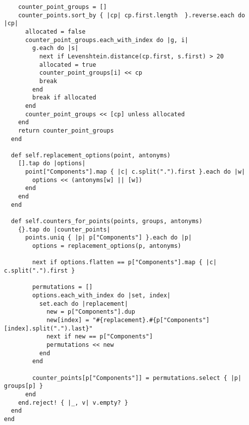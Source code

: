 \documentclass{article}
\begin{document}
\begin{verbatim}
    counter_point_groups = []
    counter_points.sort_by { |cp| cp.first.length  }.reverse.each do |cp|
      allocated = false
      counter_point_groups.each_with_index do |g, i|
        g.each do |s|
          next if Levenshtein.distance(cp.first, s.first) > 20
          allocated = true
          counter_point_groups[i] << cp
          break
        end
        break if allocated
      end
      counter_point_groups << [cp] unless allocated
    end
    return counter_point_groups
  end

  def self.replacement_options(point, antonyms)
    [].tap do |options|
      point["Components"].map { |c| c.split(".").first }.each do |w|
        options << (antonyms[w] || [w])
      end
    end
  end

  def self.counters_for_points(points, groups, antonyms)
    {}.tap do |counter_points|
      points.uniq { |p| p["Components"] }.each do |p|
        options = replacement_options(p, antonyms)

        next if options.flatten == p["Components"].map { |c| c.split(".").first }

        permutations = []
        options.each_with_index do |set, index|
          set.each do |replacement|
            new = p["Components"].dup
            new[index] = "#{replacement}.#{p["Components"][index].split(".").last}"
            next if new == p["Components"]
            permutations << new
          end
        end

        counter_points[p["Components"]] = permutations.select { |p| groups[p] }
      end
    end.reject! { |_, v| v.empty? }
  end
end


\end{verbatim}
\pagebreak
\end{document}
